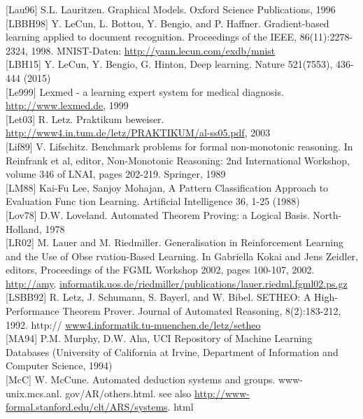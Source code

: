 \documentclass[10pt]{article}
\begin{document}
[Lau96] S.L. Lauritzen. Graphical Models. Oxford Science Publications, 1996\\[0pt]
[LBBH98] Y. LeCun, L. Bottou, Y. Bengio, and P. Haffner. Gradient-based learning applied to document recognition. Proceedings of the IEEE, 86(11):2278-2324, 1998. MNIST-Daten: \href{http://yann.lecun.com/exdb/mnist}{http://yann.lecun.com/exdb/mnist}\\[0pt]
[LBH15] Y. LeCun, Y. Bengio, G. Hinton, Deep learning. Nature 521(7553), 436-444 (2015)\\[0pt]
[Le999] Lexmed - a learning expert system for medical diagnosis. \href{http://www.lexmed.de}{http://www.lexmed.de}, 1999\\[0pt]
[Let03] R. Letz. Praktikum beweiser. \href{http://www4.in.tum.de/letz/PRAKTIKUM/al-ss05.pdf}{http://www4.in.tum.de/letz/PRAKTIKUM/al-ss05.pdf}, 2003\\[0pt]
[Lif89] V. Lifschitz. Benchmark problems for formal non-monotonic reasoning. In Reinfrank et al, editor, Non-Monotonic Reasoning: 2nd International Workshop, volume 346 of LNAI, pages 202-219. Springer, 1989\\[0pt]
[LM88] Kai-Fu Lee, Sanjoy Mohajan, A Pattern Classification Approach to Evaluation Func tion Learning. Artificial Intelligence 36, 1-25 (1988)\\[0pt]
[Lov78] D.W. Loveland. Automated Theorem Proving: a Logical Basis. North-Holland, 1978\\[0pt]
[LR02] M. Lauer and M. Riedmiller. Generalisation in Reinforcement Learning and the Use of Obse rvation-Based Learning. In Gabriella Kokai and Jens Zeidler, editors, Proceedings of the FGML Workshop 2002, pages 100-107, 2002. \href{http://amy}{http://amy}. \href{http://informatik.uos.de/riedmiller/publications/lauer.riedml.fgml02.ps.gz}{informatik.uos.de/riedmiller/publications/lauer.riedml.fgml02.ps.gz}\\[0pt]
[LSBB92] R. Letz, J. Schumann, S. Bayerl, and W. Bibel. SETHEO: A High-Performance Theorem Prover. Journal of Automated Reasoning, 8(2):183-212, 1992. http:// \href{http://www4.informatik.tu-muenchen.de/letz/setheo}{www4.informatik.tu-muenchen.de/letz/setheo}\\[0pt]
[MA94] P.M. Murphy, D.W. Aha, UCI Repository of Machine Learning Databases (University of California at Irvine, Department of Information and Computer Science, 1994)\\[0pt]
[McC] W. McCune. Automated deduction systems and groups. www-unix.mcs.anl. gov/AR/others.html. see also \href{http://www-formal.stanford.edu/clt/ARS/systems}{http://www-formal.stanford.edu/clt/ARS/systems}. html\\[0pt]
\end{document}
